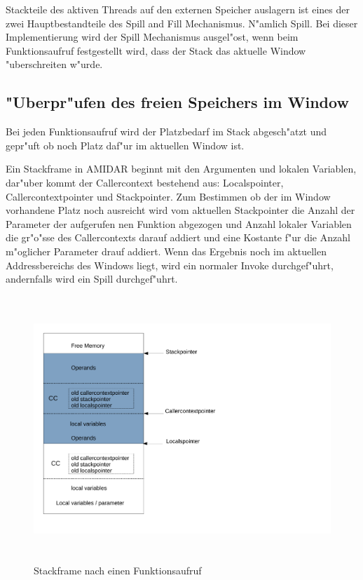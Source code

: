 Stackteile des aktiven Threads auf den externen Speicher auslagern ist eines der zwei Hauptbestandteile des Spill and Fill Mechanismus. N"amlich Spill. Bei dieser Implementierung wird der Spill Mechanismus ausgel"ost, wenn beim Funktionsaufruf festgestellt wird, dass der Stack das aktuelle Window "uberschreiten w"urde.

\subsection{"Uberpr"ufen des freien Speichers im Window}
Bei jeden Funktionsaufruf wird der Platzbedarf im Stack abgesch"atzt und gepr"uft ob noch Platz daf"ur im aktuellen Window ist. 

Ein Stackframe in AMIDAR beginnt mit den Argumenten und lokalen Variablen, dar"uber kommt der Callercontext bestehend aus: Localspointer, Callercontextpointer und Stackpointer. Zum Bestimmen ob der im Window vorhandene Platz noch ausreicht wird vom aktuellen Stackpointer die Anzahl der Parameter der aufgerufen nen Funktion abgezogen und Anzahl lokaler Variablen die gr"o{"ss}e des Callercontexts darauf addiert und eine Kostante f"ur die Anzahl m"oglicher Parameter drauf addiert. Wenn das Ergebnis noch im aktuellen Addressbereichs des Windows liegt, wird ein normaler Invoke durchgef"uhrt, andernfalls wird ein Spill durchgef"uhrt. 

\begin{figure}[H]
	\centering
	\includegraphics[height = 10cm]{PS_RS_graphics/StackframeafterInvoke.pdf}
	\caption{Stackframe nach einen Funktionsaufruf}
\end{figure}

